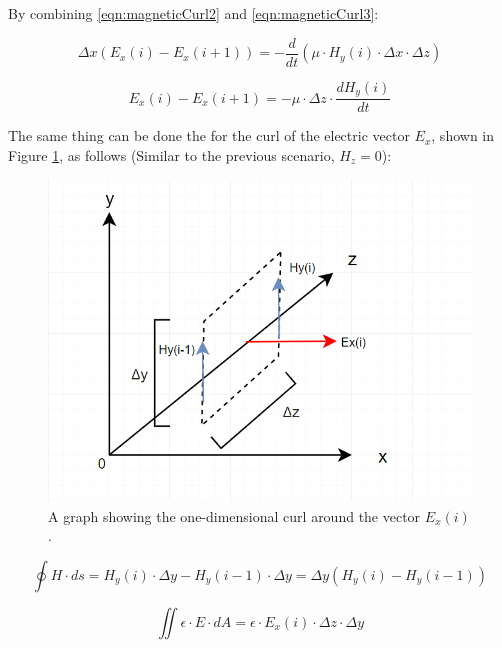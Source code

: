 By combining \ref{eqn:magneticCurl2} and \ref{eqn:magneticCurl3}:

\begin{equation}
	\label{eqn:magneticCurl4}
	\Delta x(E_x(i) - E_x(i+1)) = -\frac{d}{dt} (\mu \cdot H_y(i) \cdot \Delta x \cdot \Delta z)
\end{equation}

\begin{equation}
	\label{eqn:magneticCurl5}
	E_x(i) - E_x(i+1) = -\mu \cdot \Delta z \cdot \frac{dH_y(i)}{dt}
\end{equation}

The  same thing can be done the for the curl of the electric vector $E_x$, shown in Figure \ref{fig:fdtd1dEcurl}, as follows (Similar to the previous scenario, $H_z = 0$):

\begin{figure}
	\centering
	\includegraphics[scale=0.7]{Figures/fdtd1dEcurl}
	\decoRule
	\caption[1D Curl around $E_x$]{A graph showing the one-dimensional curl around the vector $E_x(i)$.}
	\label{fig:fdtd1dEcurl}
\end{figure}

\begin{equation}
	\label{eqn:electricCurl1}
	\oint H \cdot ds = H_y(i) \cdot \Delta y - H_y(i-1) \cdot \Delta y = \Delta y (H_y(i) - H_y(i-1))
\end{equation}

\begin{equation}
	\label{eqn:electricCurl2}
	\iint \epsilon \cdot E \cdot dA = \epsilon \cdot E_x(i) \cdot \Delta z \cdot \Delta y
\end{equation}

